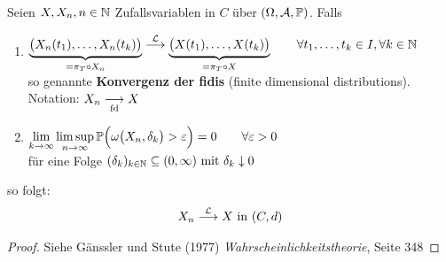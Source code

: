 \begin{satz}\label{satz7.9}
	Seien $X,X_n,n\in\N$ Zufallsvariablen in $C$ über $(\Omega,\A,\P)$. Falls
	\begin{enumerate}[label=(\arabic*)]
		\item $\begin{aligned}
			\underbrace{\big(X_n(t_1),\ldots,X_n(t_k)\big)}_{=\pi_T\circ X_n}\stackrel{\L}{\longrightarrow}\underbrace{\big(X(t_1),\ldots,X(t_k)\big)}_{=\pi_T\circ X}
			\qquad\forall t_1,\ldots,t_k\in I,\forall k\in\N
		\end{aligned}$\\
		so genannte \textbf{Konvergenz der fidis} (finite dimensional distributions).\\
		Notation: $X_n\stackrelnew{\text{fd}}{}{\longrightarrow} X$
		\item $\begin{aligned}
			\lim\limits_{k\to\infty}\limsup\limits_{n\to\infty}\P\Big(\omega\big(X_n,\delta_k\big)>\varepsilon\Big)=0\qquad\forall\varepsilon>0
		\end{aligned}$\\
		für eine Folge $(\delta_k)_{k\in\N}\subseteq(0,\infty)\mit\delta_k\downarrow0$
	\end{enumerate}
	so folgt:
	\begin{align*}
		X_n\stackrel{\L}{\longrightarrow}X\text{ in }(C,d)
	\end{align*}
\end{satz}

\begin{proof}
	Siehe Gänssler und Stute (1977) \textit{Wahrscheinlichkeitstheorie}, Seite 348
\end{proof}

